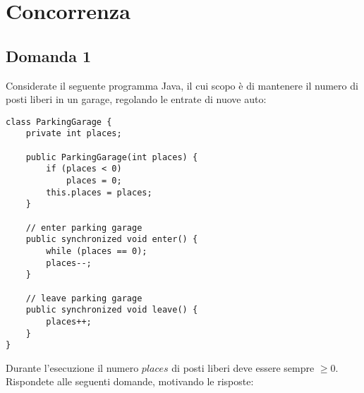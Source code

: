 \newpage

\section{Concorrenza}

\subsection{Domanda 1}
Considerate il seguente programma Java, il cui scopo è di mantenere il numero di posti liberi in un garage, regolando le entrate di nuove auto:
\begin{lstlisting}
class ParkingGarage {
	private int places;

	public ParkingGarage(int places) {
		if (places < 0)
			places = 0;
		this.places = places;
	}

	// enter parking garage
	public synchronized void enter() {
		while (places == 0);
		places--;
	}

	// leave parking garage
	public synchronized void leave() {
		places++;
	}
}
\end{lstlisting}
Durante l'esecuzione il numero $places$ di posti liberi deve essere sempre $\geq 0$. Rispondete alle seguenti domande, motivando le risposte:
